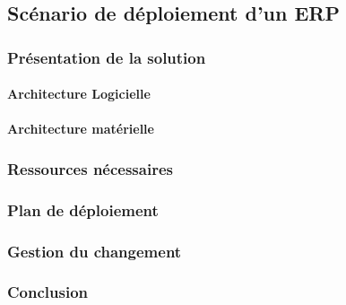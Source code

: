 \subsection{Scénario de déploiement d'un ERP}

\subsubsection{Présentation de la solution}
\paragraph{Architecture Logicielle}

\paragraph{Architecture matérielle}

\subsubsection{Ressources nécessaires}

\subsubsection{Plan de déploiement}

\subsubsection{Gestion du changement}

\subsubsection{Conclusion}